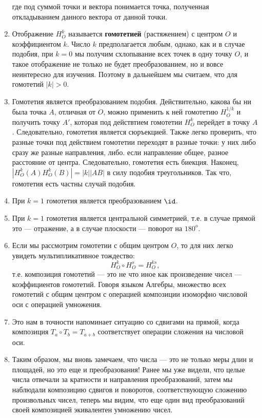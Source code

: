 \begin{enumerate}
$$$$
где под суммой точки и вектора понимается точка, полученная откладыванием данного вектора от данной точки.
\item Отображение $H_O^k$ называется \textbf{гомотетией} (растяжением) с центром $O$ и коэффициентом $k$. Число $k$ предполагается любым, однако, как и в случае подобия, при $k=0$ мы получим схлопывание всех точек в одну точку $O$, и такое отображение не только не будет преобразованием, но и вовсе неинтересно для изучения. Поэтому в дальнейшем мы считаем, что для гомотетий $|k|>0$.
\item Гомотетия является преобразованием подобия. Действительно, какова бы ни была точка $A$, отличная от $O$, можно применить к ней гомотетию $H_O^{1/k}$ и получить точку $A'$, которая под действтием гомотетии $H_O^k$ перейдет в точку $A$. Следовательно, гомотетия является сюръекцией. Также легко проверить, что разные точки под действием гомотетии переходят в разные точки: у них либо сразу же разные направления, либо. если направление общее, разное расстояние от центра. Следовательно, гомотетия есть биекция. Наконец, $|H_O^k(A)H_O^k(B)|=|k||AB|$ в силу подобия треугольников. Так что, гомотетия есть частны случай подобия.
\item При $k=1$ гомотетия является преобразованием $\id$.
\item При $k=1$ гомотетия является центральной симметрией, т.е. в случае прямой это --- отражение, а в случае плоскости --- поворот на $180^o$.
\item Если мы рассмотрим гомотетии с общим центром $O$, то для них легко увидеть мультипликативное тождество:
$$
H_O^k\circ H_O^s = H_O^{ks},
$$
т.е. композиция гомотетий --- это не что иное как произведение чисел --- коэффициентов гомотетий. Говоря языком Алгебры, множество всех гомотетий с общим центром с операцией композиции изоморфно числовой оси с операцией умножения.
\item Это нам в точности напоминает ситуацию со сдвигами на прямой, когда композиция $T_a\circ T_b=T_{a+b}$ соответствует операции сложения на числовой оси.
\item Таким образом, мы вновь замечаем, что числа --- это не только меры длин и площадей, но это еще и преобразования! Ранее мы уже видели, что целые числа отвечали за кратности и направления преобразований, затем мы наблюдали композицию сдвигов и поворотов, соответствующую сложению произвольных чисел, теперь мы видим, что еще один вид преобразований своей композицией экивалентен умножению чисел.

\end{enumerate}



